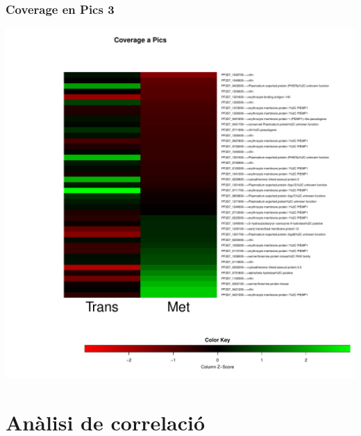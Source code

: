 \documentclass{article}\usepackage[]{graphicx}\usepackage[]{color}
\newenvironment{knitrout}{}{} %
\begin{document}
\subsubsection{Coverage en Pics 3}
\begin{knitrout}
\color{fgcolor}

{\centering \includegraphics[width=.9\linewidth]{figure/minimal-met_covapics_3-1} 

}



\end{knitrout}
\clearpage



\section{Anàlisi de correlació}
\end{document}
